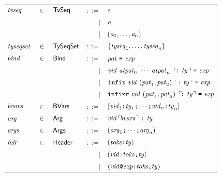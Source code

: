 \documentclass[final]{article}
\begin{document}
\begin{figure}[t]
\begin{small}
\begin{center}
  \begin{tabular}{lllrl}
    $\mathit{tvseq}$
    & $\in$
    & $\mathsf{TvSeq}$
    & $::=$
    & $\epsilon$
    \\
    &&& $\mid$
    & $\mathit{a}$
    \\
    &&& $\mid$
    & $(\mathit{a}_0,\dots,\mathit{a}_n)$
    \\

    $\mathit{tyseqset}$
    & $\in$
    & $\mathsf{TySeqSet}$
    & $::=$
    & $\{\mathit{tyseq}_1,\dots,\mathit{tyseq}_n\}$
    \\

    $\mathit{bind}$
    & $\in$
    & $\mathsf{Bind}$
    & $::=$
    & $\mathit{pat}\ \textbf{\texttt{=}}\ \mathit{exp}$
    \\
    &&& $\mid$
    & $\mathit{vid}\ \mathit{atpat}_0\ \cdots\ \mathit{atpat}_n\ \,\ulcorner\!\textbf{\texttt{:}}\ \mathit{ty}\urcorner\ \textbf{\texttt{=}}\ \mathit{exp}$
    \\
    &&& $\mid$
    & $\mathtt{infix}\ \mathit{vid}\ (\mathit{pat}_1,\mathit{pat}_2)\ \,\ulcorner\!\textbf{\texttt{:}}\ \mathit{ty}\urcorner\ \textbf{\texttt{=}}\ \mathit{exp}$
    \\
    &&& $\mid$
    & $\mathtt{infixr}\ \mathit{vid}\ (\mathit{pat}_1,\mathit{pat}_2)\ \,\ulcorner\!\textbf{\texttt{:}}\ \mathit{ty}\urcorner\ \textbf{\texttt{=}}\ \mathit{exp}$
    \\

    $\mathit{bvars}$
    & $\in$
    & $\mathsf{BVars}$
    & $::=$
    & $[\mathit{vid}_1\textbf{\texttt{:}}\mathit{ty}_1\textbf{\texttt{;}}\cdots\textbf{\texttt{;}}\mathit{vid}_n\textbf{\texttt{:}}\mathit{ty}_n]$
    \\

    $\mathit{arg}$
    & $\in$
    & $\mathsf{Arg}$
    & $::=$
    & $\mathit{vid}\,\ulcorner\!\mathit{bvars}\urcorner\ \textbf{\texttt{:}}\ \mathit{ty}$
    \\

    $\mathit{args}$
    & $\in$
    & $\mathsf{Args}$
    & $::=$
    & $(\mathit{arg}_1\textbf{\texttt{;}}\cdots\textbf{\texttt{;}}\mathit{arg}_n)$
    \\

    $\mathit{hdr}$
    & $\in$
    & $\mathsf{Header}$
    & $::=$
    & $(\mathit{toks}\textbf{\texttt{:}}\mathit{ty})$
    \\
    &&& $\mid$
    & $(\mathit{vid}\textbf{\texttt{:}}\mathit{toks}\textbf{\texttt{,}}\mathit{ty})$
    \\
    &&& $\mid$
    & $(\mathit{vid}\textbf{\texttt{@}}\mathit{exp}\textbf{\texttt{:}}\mathit{toks}\textbf{\texttt{,}}\mathit{ty})$
    \\


\end{tabular}
\end{center}
\end{small}
\end{figure}
\end{document}
